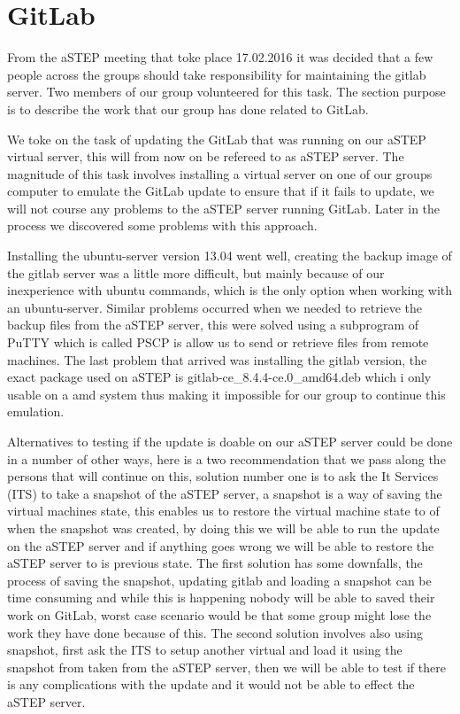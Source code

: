 \section{GitLab}
From the aSTEP meeting that toke place 17.02.2016 it was decided that a few people across the groups should take responsibility for maintaining the gitlab server. Two members of our group volunteered for this task. The section purpose is to describe the work that our group has done related to GitLab.

We toke on the task of updating the GitLab that was running on our aSTEP virtual server, this will from now on be refereed to as aSTEP server. The magnitude of this task involves installing a virtual server on one of our groups computer to emulate the GitLab update to ensure that if it fails to update, we will not course any problems to the aSTEP server running GitLab. Later in the process we discovered some problems with this approach.

Installing the ubuntu-server version 13.04 went well, creating the backup image of the gitlab server was a little more difficult, but mainly because of our inexperience with ubuntu commands, which is the only option when working with an ubuntu-server. Similar problems occurred when we needed to retrieve the backup files from the aSTEP server, this were solved using a subprogram of PuTTY which is called PSCP is allow us to send or retrieve files from remote machines. The last problem that arrived was installing the gitlab version, the exact package used on aSTEP is gitlab-ce\_8.4.4-ce.0\_amd64.deb which i only usable on a amd system thus making it impossible for our group to continue this emulation. 

Alternatives to testing if the update is doable on our aSTEP server could be done in a number of other ways, here is a two recommendation that we pass along the persons that will continue on this, solution number one is to ask the It Services (ITS) to take a snapshot of the aSTEP server, a snapshot is a way of saving the virtual machines state, this enables us to restore the virtual machine state to of when the snapshot was created, by doing this we will be able to run the update on the aSTEP server and if anything goes wrong we will be able to restore the aSTEP server to is previous state. The first solution has some downfalls, the process of saving the snapshot, updating gitlab and loading a snapshot can be time consuming and while this is happening nobody will be able to saved their work on GitLab, worst case scenario would be that some group might lose the work they have done because of this. The second solution involves also using snapshot, first ask the ITS to setup another virtual and load it using the snapshot from taken from the aSTEP server, then we will be able to test if there is any complications with the update and it would not be able to effect the aSTEP server. 


